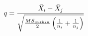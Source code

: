 \documentclass[preview]{standalone}
\begin{document}
\begin{align*}
\special{dvisvgm:raw <g id='unique000'>}q = \frac{\bar{X}_i - \bar{X}_j}{\sqrt{\frac{MS_{within}}{2}\left(\frac{1}{n_i} + \frac{1}{n_j}\right)}}\special{dvisvgm:raw </g>}
\end{align*}
\end{document}
